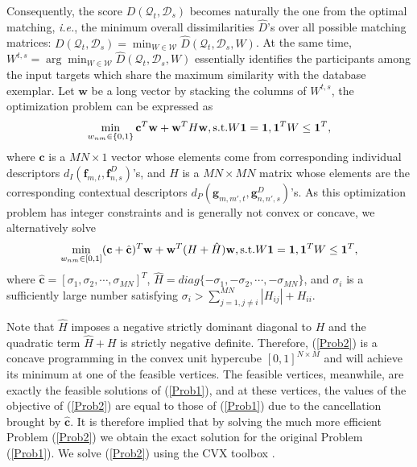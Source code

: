 Consequently, the score $D(\mathcal{Q}_{t}, \mathcal{D}_{s})$ becomes naturally the one from the optimal matching, \textit{i.e.}, the minimum overall dissimilarities $\hat{D}$'s over all possible matching matrices: $D(\mathcal{Q}_{t}, \mathcal{D}_{s})=\min_{W\in\mathcal{W}}\hat{D}(\mathcal{Q}_{t}, \mathcal{D}_{s}, W)$. At the same time, $W^{t,s}=\arg\min_{W\in\mathcal{W}}\hat{D}(\mathcal{Q}_{t}, \mathcal{D}_{s}, W)$ essentially identifies the participants among the input targets which share the maximum similarity with the database exemplar.  Let $\mathbf{w}$ be a long vector by stacking the columns of $W^{t,s}$, the optimization problem can be expressed as
\begin{equation}
\label{Prob1}
\min_{w_{nm}\in\{0,1\}}\mathbf{c}^{T}\mathbf{w}+\mathbf{w}^{T}H\mathbf{w},\textup{s.t.} W\mathbf{1}=\mathbf{1}, \mathbf{1}^{T}W\leq\mathbf{1}^{T},
\end{equation}
where $\mathbf{c}$ is a $MN\times 1$ vector whose elements come from corresponding individual descriptors $d_{I}(\mathbf{f}_{m,t}, \mathbf{f}^{D}_{n,s})$'s, and $H$ is a $MN\times MN$ matrix whose elements are the corresponding contextual descriptors $d_{P}(\mathbf{g}_{m,m',t}, \mathbf{g}^{D}_{n,n',s})$'s. As this optimization problem has integer constraints and is generally not convex or concave, we alternatively solve
\begin{equation}
\label{Prob2}
\min_{w_{nm}\in[0,1]}(\mathbf{c}+\hat{\mathbf{c}})^{T}\mathbf{w}+\mathbf{w}^{T}(H+\hat{H})\mathbf{w}, \textup{s.t.} W\mathbf{1}=\mathbf{1}, \mathbf{1}^{T}W\leq\mathbf{1}^{T},
\end{equation}
where $\hat{\mathbf{c}}=[\sigma_{1},\sigma_{2},\cdots,\sigma_{MN}]^{T}$, $\hat{H}=diag\{-\sigma_{1},-\sigma_{2},\cdots,-\sigma_{MN}\}$, and $\sigma_{i}$ is a sufficiently large number satisfying $\sigma_{i}>\sum^{MN}_{j=1,j\neq i}|H_{ij}|+H_{ii}$.

Note that $\hat{H}$ imposes a negative strictly dominant diagonal to $H$ and the quadratic term $\hat{H}+H$ is strictly negative definite. Therefore, (\ref{Prob2}) is a concave programming in the convex unit hypercube $[0,1]^{N\times M}$ and will achieve its minimum at one of the feasible vertices. The feasible vertices, meanwhile, are exactly the feasible solutions of (\ref{Prob1}), and at these vertices, the values of the objective of (\ref{Prob2}) are equal to those of (\ref{Prob1}) due to the cancellation brought by $\hat{\mathbf{c}}$. It is therefore implied that by solving the much more efficient Problem (\ref{Prob2}) we obtain the exact solution for the original Problem (\ref{Prob1}). We solve (\ref{Prob2}) using the CVX toolbox \cite{cvx}.



